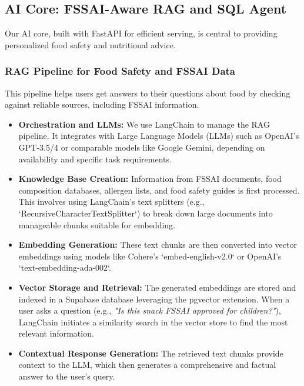 \subsection{AI Core: FSSAI-Aware RAG and SQL Agent}
Our AI core, built with FastAPI for efficient serving, is central to providing personalized food safety and nutritional advice.

\subsubsection{RAG Pipeline for Food Safety and FSSAI Data}
This pipeline helps users get answers to their questions about food by checking against reliable sources, including FSSAI information.
\begin{itemize}
    \item \textbf{Orchestration and LLMs:} We use LangChain to manage the RAG pipeline. It integrates with Large Language Models (LLMs) such as OpenAI's GPT-3.5/4 or comparable models like Google Gemini, depending on availability and specific task requirements.
    \item \textbf{Knowledge Base Creation:} Information from FSSAI documents, food composition databases, allergen lists, and food safety guides is first processed. This involves using LangChain's text splitters (e.g., `RecursiveCharacterTextSplitter`) to break down large documents into manageable chunks suitable for embedding.
    \item \textbf{Embedding Generation:} These text chunks are then converted into vector embeddings using models like Cohere's `embed-english-v2.0` or OpenAI's `text-embedding-ada-002`.
    \item \textbf{Vector Storage and Retrieval:} The generated embeddings are stored and indexed in a Supabase database leveraging the pgvector extension. When a user asks a question (e.g., \textit{"Is this snack FSSAI approved for children?"}), LangChain initiates a similarity search in the vector store to find the most relevant information.
    \item \textbf{Contextual Response Generation:} The retrieved text chunks provide context to the LLM, which then generates a comprehensive and factual answer to the user's query.
\end{itemize}

